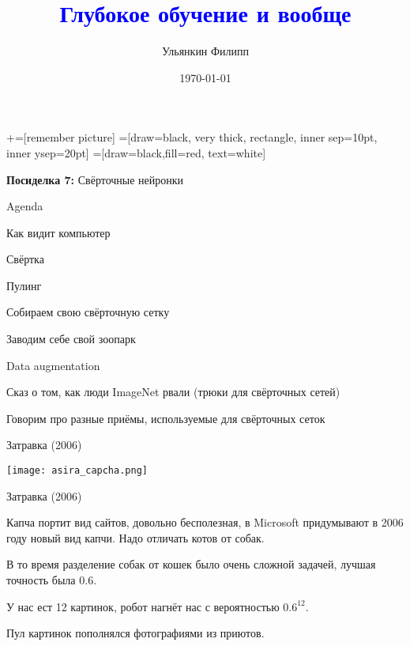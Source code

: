 \documentclass[notes,12pt, aspectratio=169]{beamer}
\title[]{\textcolor{blue}{Глубокое обучение и вообще}}
\author{Ульянкин Филипп}
\date{\today}
\newenvironment{wideitemize}{\itemize\addtolength{\itemsep}{10pt}}{\enditemize}
\begin{document}
\newcommand\marktopleft[1]{%
    \tikz[overlay,remember picture] 
        \node (marker-#1-a) at (-.3em,.3em) {};%
}
\newcommand\markbottomright[2]{%
    \tikz[overlay,remember picture] 
        \node (marker-#1-b) at (0em,0em) {};%
}
+=[remember picture] 
 =[draw=black, very thick, rectangle, inner sep=10pt, inner ysep=20pt]
 =[draw=black,fill=red, text=white]


\begin{frame}
\maketitle
\centering \textbf{\color{blue} Посиделка 7:}  Свёрточные нейронки
\end{frame}


\begin{frame}{Agenda}
\begin{wideitemize}
	\item Как видит компьютер
	\item Свёртка
	\item Пулинг
	\item Собираем свою свёрточную сетку 
	\item Заводим себе свой зоопарк 
	\item Data augmentation 
	\item Сказ о том, как люди ImageNet рвали  (трюки для свёрточных сетей)
	\item Говорим про разные приёмы, используемые для свёрточных сеток
\end{wideitemize} 
\end{frame}


\begin{frame}{Затравка (2006)}
\begin{center}
	\texttt{[image: asira\_capcha.png]}
\end{center}
\end{frame}


\begin{frame}{Затравка (2006)}
\begin{wideitemize}
	\item Капча портит вид сайтов, довольно бесполезная, в Microsoft придумывают в 2006 году новый вид капчи. Надо отличать котов от собак. 
	\item В то время разделение собак от кошек было очень сложной задачей, лучшая точность была $0.6$. 
	\item У нас ест 12 картинок, робот нагнёт нас с вероятностью $0.6^{12}$. 
	\item Пул картинок пополнялся фотографиями из приютов. 
\end{wideitemize} 
\end{frame}
\end{document}
